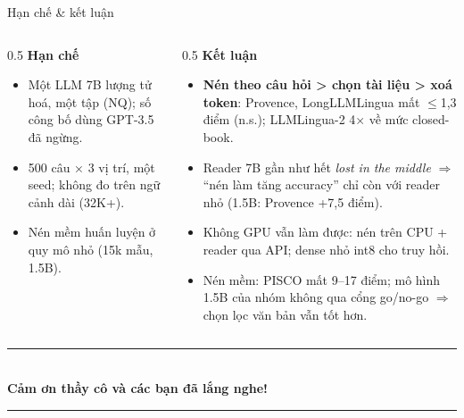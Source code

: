 \documentclass[aspectratio=169,11pt]{beamer}
\begin{document}
\begin{frame}{Hạn chế \& kết luận}
  \begin{columns}[T]
    \begin{column}{0.5\textwidth}
      \small\textbf{\color{hustred}Hạn chế}
      {\footnotesize
      \begin{itemize}\setlength\itemsep{0.3em}
        \item Một LLM 7B lượng tử hoá, một tập (NQ); số công bố dùng GPT-3.5 đã ngừng.
        \item 500 câu × 3 vị trí, một seed; không đo trên ngữ cảnh dài (32K+).
        \item Nén mềm huấn luyện ở quy mô nhỏ (15k mẫu, 1.5B).
      \end{itemize}}
    \end{column}
    \begin{column}{0.5\textwidth}
      \small\textbf{\color{hustred}Kết luận}
      {\footnotesize
      \begin{itemize}\setlength\itemsep{0.3em}
        \item \textbf{Nén theo câu hỏi > chọn tài liệu > xoá token}: Provence, LongLLMLingua mất
        $\le$1,3 điểm (n.s.); LLMLingua-2 4$\times$ về mức closed-book.
        \item Reader 7B gần như hết \emph{lost in the middle} $\Rightarrow$ ``nén làm tăng accuracy'' chỉ còn
        với reader nhỏ (1.5B: Provence +7,5 điểm).
        \item Không GPU vẫn làm được: nén trên CPU + reader qua API; dense nhỏ int8 cho truy hồi.
        \item Nén mềm: PISCO mất 9--17 điểm; mô hình 1.5B của nhóm không qua cổng go/no-go $\Rightarrow$ chọn lọc văn bản vẫn tốt hơn.
      \end{itemize}}
    \end{column}
  \end{columns}
  \vspace{0.2em}
  \begin{center}
    {\color{hustred}\rule{0.7\textwidth}{1pt}}\\[0.7ex]
    {\Large\bfseries\color{hustred} Cảm ơn thầy cô và các bạn đã lắng nghe!}\\[0.4ex]
    {\color{hustred}\rule{0.7\textwidth}{1pt}}
  \end{center}
\end{frame}
\end{document}
